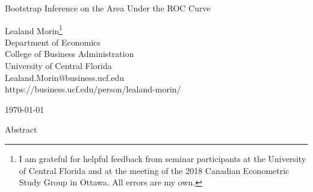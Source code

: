 



\begin{center}
\vspace{3.0in}


{\Large
Bootstrap Inference on the Area Under the ROC Curve \\
}

\vspace{0.75in}


{\large{Lealand Morin\footnote{I am grateful for helpful feedback
from seminar participants at
the University of Central Florida and at the meeting of the 2018 Canadian Econometric Study Group in Ottawa. %
All errors are my own. } \\
Department of Economics \\
%
College of Business Administration \\
University of Central Florida \\
Lealand.Morin@business.ucf.edu \\
https://business.ucf.edu/person/lealand-morin/ }}




\vspace{0.5in}

\today

\vspace{0.50in}



{\large{Abstract}}  \\
\vspace{0.25in}

\end{center}

